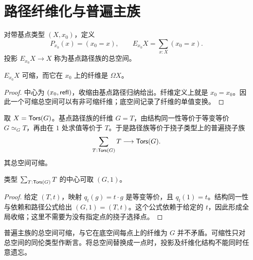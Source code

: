 \section{路径纤维化与普遍主族}
\begin{definition}[基点路径族]
对带基点类型 $(X,x_0)$，定义
\[
P_{x_0}(x)=(x_0=x),
\qquad
E_{x_0}X=\sum_{x:X}(x_0=x).
\]
投影 $E_{x_0}X\to X$ 称为基点路径族的总空间。
\end{definition}
\begin{proposition}
$E_{x_0}X$ 可缩，而它在 $x_0$ 上的纤维是 $\Omega X$。
\end{proposition}
\begin{proof}
中心为 $(x_0,\mathsf{refl})$，收缩由基点路径归纳给出。纤维定义上就是 $x_0=x_0$。因此一个可缩总空间可以有非可缩纤维；底空间记录了纤维的单值变换。
\end{proof}
\begin{example}
取 $X=\mathsf{Tors}(G)$。基点路径族的纤维 $G=T$，由结构同一性等价于等变等价 $G\simeq_G T$，再由在 $1$ 处求值等价于 $T$。于是路径族等价于挠子类型上的普遍挠子族
\[
\sum_{T:\mathsf{Tors}(G)}T\longrightarrow\mathsf{Tors}(G).
\]
其总空间可缩。
\end{example}
\begin{proposition}[带点挠子总空间可缩]
类型 $\sum_{T:\mathsf{Tors}(G)}T$ 的中心可取 $(G,1)$。
\end{proposition}
\begin{proof}
给定 $(T,t)$，映射 $q_t(g)=t\cdot g$ 是等变等价，且 $q_t(1)=t$。结构同一性与依赖和路径公式给出 $(G,1)=(T,t)$。这个公式依赖于给定的 $t$，因此形成全局收缩；这里不需要为没有指定点的挠子选择点。
\end{proof}
\begin{remark}
普遍主族的总空间可缩，与它在底空间每点上的纤维为 $G$ 并不矛盾。可缩性只对总空间的同伦类型作断言。将总空间替换成一点时，投影及纤维化结构不能同时任意遗忘。
\end{remark}

